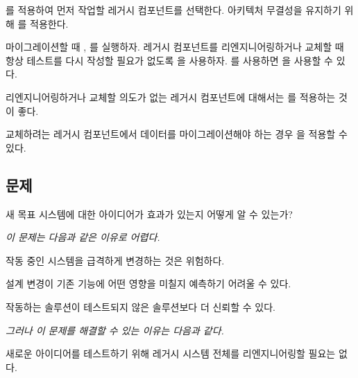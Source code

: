 \documentclass[a4paper,10pt,twoside]{book}
\begin{document}
를 적용하여 먼저 작업할 레거시 컴포넌트를 선택한다. 아키텍처 무결성을 유지하기 위해 를 적용한다. 

마이그레이션할 때 , 를 실행하자. 레거시 컴포넌트를 리엔지니어링하거나 교체할 때 항상 테스트를 다시 작성할 필요가 없도록 을 사용하자. 를 사용하면 을 사용할 수 있다.

리엔지니어링하거나 교체할 의도가 없는 레거시 컴포넌트에 대해서는 를 적용하는 것이 좋다.

교체하려는 레거시 컴포넌트에서 데이터를 마이그레이션해야 하는 경우 을 적용할 수 있다.



\subsection*{문제}

새 목표 시스템에 대한 아이디어가 효과가 있는지 어떻게 알 수 있는가?

\emph{이 문제는 다음과 같은 이유로 어렵다.}

\begin{bulletlist}
\item 작동 중인 시스템을 급격하게 변경하는 것은 위험하다.

\item 설계 변경이 기존 기능에 어떤 영향을 미칠지 예측하기 어려울 수 있다.

\item 작동하는 솔루션이 테스트되지 않은 솔루션보다 더 신뢰할 수 있다.
\end{bulletlist}

\emph{그러나 이 문제를 해결할 수 있는 이유는 다음과 같다.}

\begin{bulletlist}
\item 새로운 아이디어를 테스트하기 위해 레거시 시스템 전체를 리엔지니어링할 필요는 없다.
\end{bulletlist}
\end{document}
